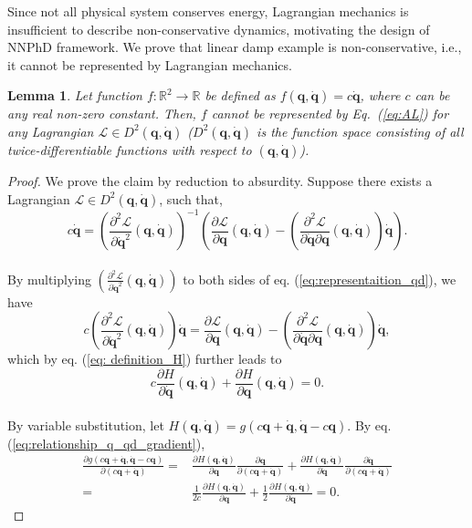 \documentclass[aps,pre,reprint,superscriptaddress,nofootinbib,amsmath,amssymb]{revtex4-2}
\newcommand{\mat}[1]{\mathbf{#1}}
\newcommand{\q}{\mat{q}}
\newcommand{\qd}{\dot{\mat{q}}}
\newcommand{\lag}{\mathcal{L}}
\newtheorem{lemma}{Lemma}
\begin{document}
Since not all physical system conserves energy, Lagrangian mechanics is insufficient to describe non-conservative dynamics, motivating the design of NNPhD framework. We prove that linear damp example is non-conservative, i.e., it cannot be represented by Lagrangian mechanics.
\begin{lemma}
	Let function $f:\mathbb{R}^2\rightarrow\mathbb{R}$ be defined as $f(\q,\qd)=c\qd$, where $c$ can be any real non-zero constant. Then, $f$ cannot be represented by Eq.~(\ref{eq:AL}) for any Lagrangian $\lag\in D^2(\q,\qd)$ ($D^2(\q,\qd)$ is the function space consisting of all twice-differentiable functions with respect to $(\q, \qd)$).
\end{lemma}
\begin{proof}
	We prove the claim by reduction to absurdity. Suppose there exists a Lagrangian $\lag\in D^2(\q,\qd) $, such that, 
	\begin{equation}
		\label{eq:representaition_qd}
		c\qd=\left(\frac{\partial^2 \lag}{\partial \qd^2}(\q,\qd)\right)^{-1}\left(\frac{\partial \lag}{\partial \q}(\q,\qd)-\left(\frac{\partial^2 \lag}{\partial \qd\partial \q}(\q,\qd)\right) \qd\right).
	\end{equation}
	\\By multiplying $\left(\frac{\partial^2 \lag}{\partial \qd^2}(\q,\qd)\right)$ to both sides of eq. (\ref{eq:representaition_qd}), we have 
	\begin{equation*}
		c\left(\frac{\partial^2 \lag}{\partial \qd^2}(\q,\qd)\right)\qd=\frac{\partial \lag}{\partial \q}(\q,\qd)-\left(\frac{\partial^2 \lag}{\partial \qd\partial \q}(\q,\qd)\right) \qd,
	\end{equation*}
	which by eq. (\ref{eq: definition_H}) further leads to 
	\begin{equation}
		\label{eq:relationship_q_qd_gradient}
		c\frac{\partial H }{\partial \qd}(\q,\qd)+\frac{\partial H }{\partial \q}(\q,\qd)=0.
	\end{equation}
	\\By variable substitution, let $H(\q,\qd)=g(c\q+\qd,\qd-c\q)$. By eq. (\ref{eq:relationship_q_qd_gradient}), 
	\begin{align*}
	    \frac{\partial g(c\q+\qd,\qd-c\q)}{\partial (c\q+\qd)}= &\frac{\partial H(\q,\qd)}{\partial \q}\frac{\partial \q}{\partial (c\q+\qd)}+\frac{\partial H(\q,\qd)}{\partial \qd}\frac{\partial\qd}{\partial (c\q+\qd)}
	    \\
	    =&\frac{1}{2c}\frac{\partial H(\q,\qd)}{\partial \q}+\frac{1}{2}\frac{\partial H(\q,\qd)}{\partial \qd}=0.

\end{align*}
\end{proof}
\end{document}
